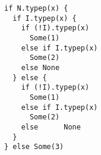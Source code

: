\begin{lstlisting}[style=scalaioScala]
if N.typep(x) {
  if I.typep(x) {
    if (!I).typep(x)
      Some(1)
    else if I.typep(x)
      Some(2)
    else None
  } else {
    if (!I).typep(x)
      Some(1)
    else if I.typep(x)
      Some(2)
    else      None
  }
} else Some(3)
\end{lstlisting}
